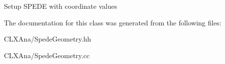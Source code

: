 Setup S\+P\+E\+DE with coordinate values 

The documentation for this class was generated from the following files\+:\begin{DoxyCompactItemize}
\item 
C\+L\+X\+Ana/Spede\+Geometry.\+hh\item 
C\+L\+X\+Ana/Spede\+Geometry.\+cc\end{DoxyCompactItemize}
